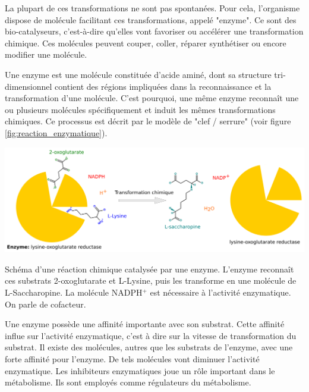 \begin{refsection}
    La plupart de ces transformations ne sont pas spontanées. Pour cela, l'organisme dispose de molécule facilitant ces transformations, appelé "enzyme". Ce sont des bio-catalyseurs, c'est-à-dire qu'elles vont favoriser ou accélérer une transformation chimique. Ces molécules peuvent couper, coller, réparer synthétiser ou encore modifier une molécule.
    
    Une enzyme est une molécule constituée d'acide aminé, dont sa structure tri-dimensionnel contient des régions impliquées dans la reconnaissance et la transformation d’une molécule. C'est pourquoi, une même enzyme reconnaît une ou plusieurs molécules spécifiquement et induit les mêmes transformations chimiques. Ce processus est décrit par le modèle de "clef / serrure" (voir figure \ref{fig:reaction_enzymatique}).
    \begin{shadedfigure}
        \centering
        \includegraphics[width=\textwidth]{img/lysine-oxoglutarate_reductase.png}
        \caption{Schéma d'une réaction chimique catalysée par une enzyme. L'enzyme reconnaît ces substrats 2-oxoglutarate et L-Lysine, puis les transforme en une molécule de L-Saccharopine. La molécule NADPH$^{+}$ est nécessaire à l'activité enzymatique. On parle de cofacteur.}
        \label{fig:reaction_enzymatique}
    \end{shadedfigure}
    
    Une enzyme possède une affinité importante avec son substrat. Cette affinité influe sur l’activité enzymatique, c’est à dire sur la vitesse de transformation du substrat. Il existe des molécules, autres que les substrats de l’enzyme,  avec  une forte affinité pour l’enzyme. De tels molécules vont diminuer l’activité enzymatique. Les inhibiteurs enzymatiques joue un rôle important dans le métabolisme. Ils sont employés comme régulateurs du métabolisme. 
    


\end{refsection}
